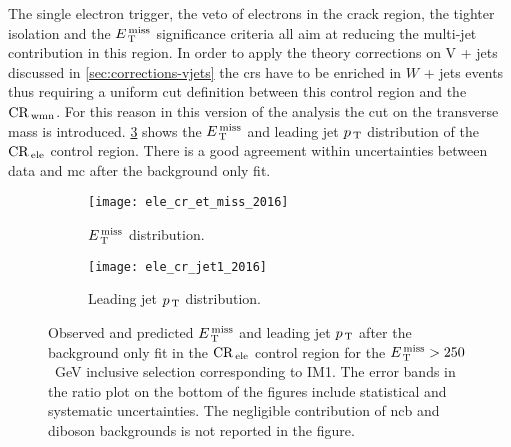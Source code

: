 The single electron trigger, the veto of electrons in the crack region, the
tighter isolation and the $E_\mathrm{\, T}^\mathrm{\, miss}$ significance criteria all aim at reducing the
multi-jet contribution in this region. In order to apply the theory corrections
on V + jets discussed in \cref{sec:corrections-vjets} the \glspl{cr} have to be
enriched in $W$ + jets events thus requiring a uniform cut definition between
this control region and the $\mathrm{CR}_\mathrm{\, wmn}$. For this reason in this version of the
analysis the cut on the transverse mass is
introduced. \cref{fig:ele_cr_plots_2016} shows the $E_\mathrm{\, T}^\mathrm{\, miss}$ and leading jet $p_\mathrm{\, T}$
distribution of the $\mathrm{CR}_\mathrm{\, ele}$ control region. There is a good agreement within
uncertainties between data and \gls{mc} after the background only fit.
\begin{figure}[!htb]
  \centering
  \begin{subfigure}[t]{.48\linewidth}
    \texttt{[image: ele\_cr\_et\_miss\_2016]}
    \caption{$E_\mathrm{\, T}^\mathrm{\, miss}$ distribution.}
    \label{fig:ele_cr_met}
  \end{subfigure}
  \begin{subfigure}[t]{.48\linewidth}
    \texttt{[image: ele\_cr\_jet1\_2016]}
    \caption{Leading jet $p_\mathrm{\, T}$ distribution.}
    \label{fig:ele_cr_jet1}
  \end{subfigure}
  \caption{Observed and predicted $E_\mathrm{\, T}^\mathrm{\, miss}$ and leading jet $p_\mathrm{\, T}$ after the
    background only fit in the $\mathrm{CR}_\mathrm{\, ele}$ control region for the $E_\mathrm{\, T}^\mathrm{\, miss} > 250$~GeV
    inclusive selection corresponding to IM1. The error bands in the ratio plot
    on the bottom of the figures include statistical and systematic
    uncertainties. The negligible contribution of \gls{ncb} and diboson
    backgrounds is not reported in the figure.}
  \label{fig:ele_cr_plots_2016}
\end{figure}
